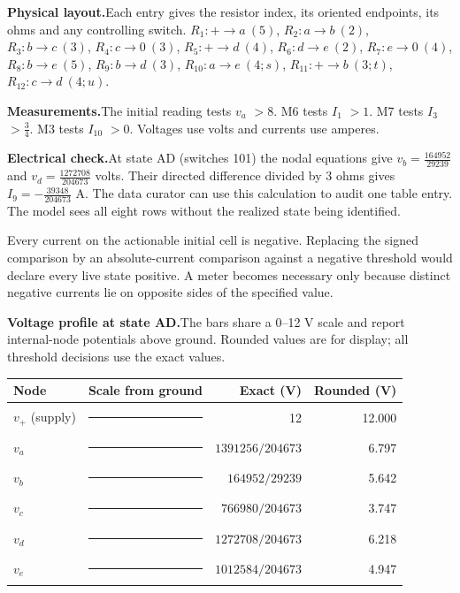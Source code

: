 \documentclass[12pt,letterpaper]{article}
\newcommand{\reading}[2]{\par\smallskip\textsf{\color{accent}\bfseries #1}\enspace #2\par}
\begin{document}
\reading{Physical layout.}{Each entry gives the resistor index, its oriented endpoints, its ohms and any controlling switch. $R_{1}\colon +\to a\ (5)$, $R_{2}\colon a\to b\ (2)$, $R_{3}\colon b\to c\ (3)$, $R_{4}\colon c\to 0\ (3)$, $R_{5}\colon +\to d\ (4)$, $R_{6}\colon d\to e\ (2)$, $R_{7}\colon e\to 0\ (4)$, $R_{8}\colon b\to e\ (5)$, $R_{9}\colon b\to d\ (3)$, $R_{10}\colon a\to e\ (4;s)$, $R_{11}\colon +\to b\ (3;t)$, $R_{12}\colon c\to d\ (4;u)$.}

\reading{Measurements.}{The initial reading tests $v_{a}$ $>8$. M6 tests $I_{1}$ $>1$. M7 tests $I_{3}$ $>\tfrac{3}{4}$. M3 tests $I_{10}$ $>0$. Voltages use volts and currents use amperes.}

\reading{Electrical check.}{At state AD (switches 101) the nodal equations give $v_{b}=\tfrac{164952}{29239}$ and $v_{d}=\tfrac{1272708}{204673}$ volts. Their directed difference divided by $3$ ohms gives $I_{9}=-\tfrac{39348}{204673}$ A. The data curator can use this calculation to audit one table entry. The model sees all eight rows without the realized state being identified.}

Every current on the actionable initial cell is negative. Replacing the signed comparison by an absolute-current comparison against a negative threshold would declare every live state positive. A meter becomes necessary only because distinct negative currents lie on opposite sides of the specified value.
\reading{Voltage profile at state AD.}{The bars share a 0--12 V scale and report internal-node potentials above ground. Rounded values are for display; all threshold decisions use the exact values.}

\begin{center}{\footnotesize\setlength{\tabcolsep}{4pt}\begin{tabularx}{\linewidth}{@{}lYrr@{}}\toprule
Node & Scale from ground & Exact (V) & Rounded (V)\\ \midrule
$v_{+}$ (supply) & {\color{mute}\rule{132pt}{1.4pt}} & 12 & 12.000\\
$v_{a}$ & {\color{accent}\rule{74.772pt}{3.4pt}} & $1391256/204673$ & 6.797\\
$v_{b}$ & {\color{accent}\rule{62.057pt}{3.4pt}} & $164952/29239$ & 5.642\\
$v_{c}$ & {\color{accent}\rule{41.221pt}{3.4pt}} & $766980/204673$ & 3.747\\
$v_{d}$ & {\color{accent}\rule{68.401pt}{3.4pt}} & $1272708/204673$ & 6.218\\
$v_{e}$ & {\color{accent}\rule{54.421pt}{3.4pt}} & $1012584/204673$ & 4.947\\ \bottomrule\end{tabularx}}
\end{center}
\end{document}
